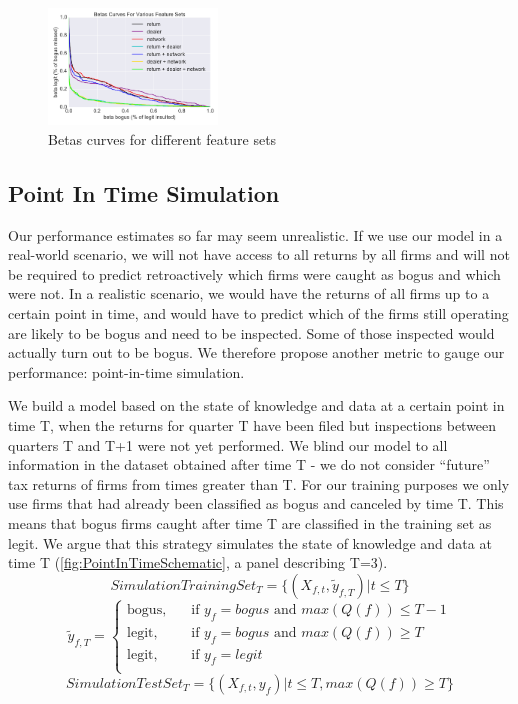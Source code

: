 \begin{figure}
  \includegraphics[width=0.4\textwidth]{figures/PerformanceDifferentFeatureSets_v3.png}
  \caption{Betas curves for different feature sets}
  \label{fig:AllDataPerformanceDifferentFeatureSets}
\end{figure}

\subsection{Point In Time Simulation}
\label{subsec:PITSimulation}
Our performance estimates so far may seem unrealistic. If we use our model in a real-world scenario, we will not have access to all returns by all firms and will not be required to predict retroactively which firms were caught as bogus and which were not. In a realistic scenario, we would have the returns of all firms up to a certain point in time, and would have to predict which of the firms still operating are likely to be bogus and need to be inspected. Some of those inspected would actually turn out to be bogus. We therefore propose another metric to gauge our performance: point-in-time simulation. 

We build a model based on the state of knowledge and data at a certain point in time T, when the returns for quarter T have been filed but inspections between quarters T and T+1 were not yet performed. We blind our model to all information in the dataset obtained after time T - we do not consider ``future'' tax returns of firms from times greater than T. For our training purposes we only use firms that had already been classified as bogus and canceled by time T. This means that bogus firms caught after time T are classified in the training set as legit. We argue that this strategy simulates the state of knowledge and data at time T (\cref{fig:PointInTimeSchematic}, a panel describing T=3).
\[SimulationTrainingSet_T = \{(X_{f,t},\tilde{y}_{f,T}) | t\le T\}\]
\[   
\tilde{y}_{f,T} =
     \begin{cases}
       \text{bogus,} &\quad\text{if $y_f=bogus$ and $max(Q(f)) \le T-1$} \\
       \text{legit,} &\quad\text{if $y_f=bogus$ and $max(Q(f)) \ge T$} \\
       \text{legit,} &\quad\text{if $y_f=legit$} \\
     \end{cases}
\]
\[SimulationTestSet_T = \{(X_{f,t},y_f) | t\le T,max(Q(f)) \ge T\}\]

